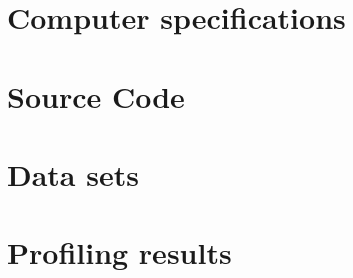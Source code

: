 \appendix

\chapter{Computer specifications}
\label{apdx:computerSpecifications}


\chapter{Source Code}
\label{apdx:sourceCode}


\chapter{Data sets}
\label{apdx:dataSets}


\chapter{Profiling results}
\label{apdx:profiling}

